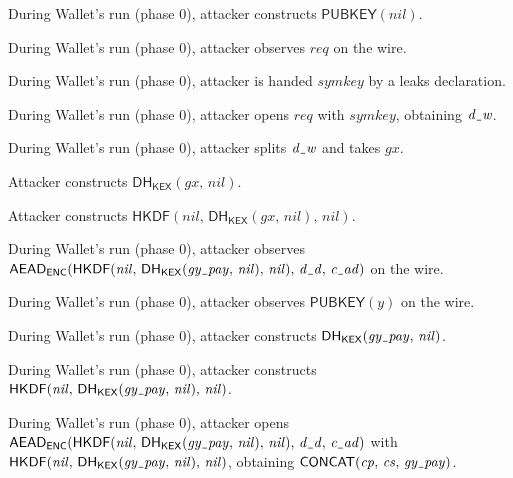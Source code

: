\documentclass[11pt]{article}
\newcommand{\vpus}{\kern0.06em\rule[-0.22ex]{0.34em}{0.045em}\kern0.06em}
\newcommand{\vpprim}[2]{\mathsf{#1}_{\mathsf{#2}}}
\newcommand{\vpprimo}[1]{\mathsf{#1}}
\newcommand{\vpconst}[1]{\mathit{#1}}
\newcommand{\vpsep}{\allowbreak\,}
\newcommand{\vpterm}[1]{\ensuremath{#1}}
\newcommand{\vpactor}[1]{\textsf{#1}}
\begin{document}
\begin{vptrace}
\item During \vpactor{Wallet}'s run (phase 0), attacker constructs \vpterm{\vpprimo{PUBKEY}(\vpconst{nil})}.
\item During \vpactor{Wallet}'s run (phase 0), attacker observes \vpterm{\vpconst{req}} on the wire.
\item During \vpactor{Wallet}'s run (phase 0), attacker is handed \vpterm{\vpconst{symkey}} by a leaks declaration.
\item During \vpactor{Wallet}'s run (phase 0), attacker opens \vpterm{\vpconst{req}} with \vpterm{\vpconst{symkey}}, obtaining \vpterm{\vpconst{d\vpus w}}.
\item During \vpactor{Wallet}'s run (phase 0), attacker splits \vpterm{\vpconst{d\vpus w}} and takes \vpterm{\vpconst{gx}}.
\item \vpactor{Attacker} constructs \vpterm{\vpprim{DH}{KEX}(\vpconst{gx},\vpsep \vpconst{nil})}.
\item \vpactor{Attacker} constructs \vpterm{\vpprimo{HKDF}(\vpconst{nil},\vpsep \vpprim{DH}{KEX}(\vpconst{gx},\vpsep \vpconst{nil}),\vpsep \vpconst{nil})}.
\item During \vpactor{Wallet}'s run (phase 0), attacker observes \vpterm{\vpprim{AEAD}{ENC}(\vpprimo{HKDF}(\vpconst{nil},\vpsep \vpprim{DH}{KEX}(\vpconst{gy\vpus pay},\vpsep \vpconst{nil}),\vpsep \vpconst{nil}),\vpsep \vpconst{d\vpus d},\vpsep \vpconst{c\vpus ad})} on the wire.
\item During \vpactor{Wallet}'s run (phase 0), attacker observes \vpterm{\vpprimo{PUBKEY}(\vpconst{y})} on the wire.
\item During \vpactor{Wallet}'s run (phase 0), attacker constructs \vpterm{\vpprim{DH}{KEX}(\vpconst{gy\vpus pay},\vpsep \vpconst{nil})}.
\item During \vpactor{Wallet}'s run (phase 0), attacker constructs \vpterm{\vpprimo{HKDF}(\vpconst{nil},\vpsep \vpprim{DH}{KEX}(\vpconst{gy\vpus pay},\vpsep \vpconst{nil}),\vpsep \vpconst{nil})}.
\item During \vpactor{Wallet}'s run (phase 0), attacker opens \vpterm{\vpprim{AEAD}{ENC}(\vpprimo{HKDF}(\vpconst{nil},\vpsep \vpprim{DH}{KEX}(\vpconst{gy\vpus pay},\vpsep \vpconst{nil}),\vpsep \vpconst{nil}),\vpsep \vpconst{d\vpus d},\vpsep \vpconst{c\vpus ad})} with \vpterm{\vpprimo{HKDF}(\vpconst{nil},\vpsep \vpprim{DH}{KEX}(\vpconst{gy\vpus pay},\vpsep \vpconst{nil}),\vpsep \vpconst{nil})}, obtaining \vpterm{\vpprimo{CONCAT}(\vpconst{cp},\vpsep \vpconst{cs},\vpsep \vpconst{gy\vpus pay})}.

\end{vptrace}
\end{document}
